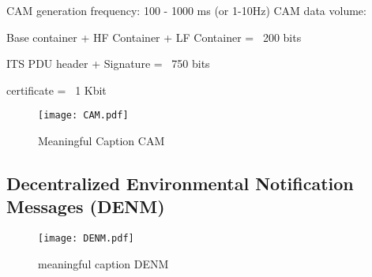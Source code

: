 

CAM generation frequency: 100 - 1000 ms (or 1-10Hz)
CAM data volume:
    
    Base container
    + HF Container 
    + LF Container
    = ~200 bits
    
    ITS PDU header
    + Signature
    = ~750 bits
    
    certificate = ~1 Kbit


\begin{figure}[H]
    \centering
    \texttt{[image: CAM.pdf]}
    \caption{Meaningful Caption CAM}
    \label{fig:cam-structure}
\end{figure}


\subsection{Decentralized Environmental Notification Messages (DENM)}


\begin{figure}[H]
    \centering
    \texttt{[image: DENM.pdf]}
    \caption{meaningful caption DENM}
    \label{fig:denm-structure}
\end{figure}
